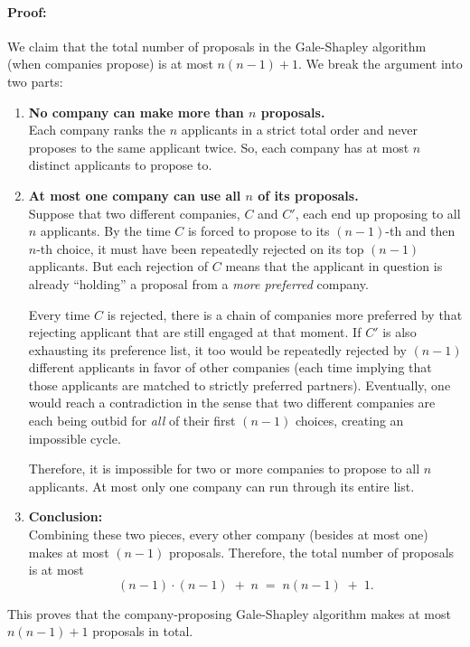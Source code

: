 \documentclass[12pt]{article}
\begin{document}
\paragraph{Proof:}
We claim that the total number of proposals in the Gale-Shapley algorithm (when companies propose) is at most \(n(n-1) + 1\). We break the argument into two parts:
\begin{enumerate}
    \item \textbf{No company can make more than \(n\) proposals.} \\
    Each company ranks the \(n\) applicants in a strict total order and never proposes to the same applicant twice. So, each company has at most \(n\) distinct applicants to propose to.

    \item \textbf{At most one company can use all \(n\) of its proposals.} \\
    Suppose that two different companies, \(C\) and \(C'\), each end up proposing to all \(n\) applicants. By the time \(C\) is forced to propose to its \((n-1)\)-th and then \(n\)-th choice, it must have been repeatedly rejected on its top \((n-1)\) applicants. But each rejection of \(C\) means that the applicant in question is already ``holding'' a proposal from a \emph{more preferred} company. 

    Every time \(C\) is rejected, there is a chain of companies more preferred by that rejecting applicant that are still engaged at that moment. If \(C'\) is also exhausting its preference list, it too would be repeatedly rejected by \((n-1)\) different applicants in favor of other companies (each time implying that those applicants are matched to strictly preferred partners). Eventually, one would reach a contradiction in the sense that two different companies are each being outbid for \emph{all} of their first \((n-1)\) choices, creating an impossible cycle.

    Therefore, it is impossible for two or more companies to propose to all \(n\) applicants. At most only one company can run through its entire list.

    \item \textbf{Conclusion:} \\
    Combining these two pieces, every other company (besides at most one) makes at most \((n-1)\) proposals. Therefore, the total number of proposals is at most
    \[
    (n-1) \cdot (n-1) \;+\; n \;=\; n(n-1) \;+\; 1.
    \]
\end{enumerate}
This proves that the company-proposing Gale-Shapley algorithm makes at most \(n(n-1) + 1\) proposals in total.
\end{document}
